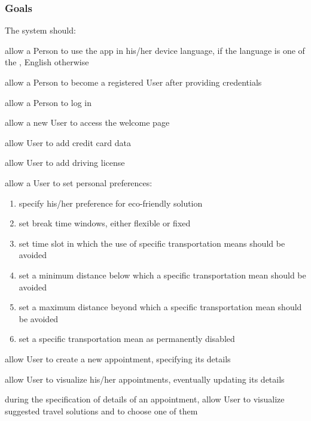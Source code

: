 \subsubsection{Goals}
The system should:
	\begin{enumerate}[label={[G\arabic*]}]
		\item \label{G_dev_language} allow a Person to use the app in his/her device language, if the language is one of the , English otherwise
		\item \label{G_become_registered} allow a Person to become a registered User after providing credentials
		\item \label{G_log_in} allow a Person to log in
		\item \label{G_welcome_page} allow a new User to access the welcome page
		\item \label{G_add_credit_card} allow User to add credit card data
		\item \label{G_add_licence} allow User to add driving license
		\item \label{G_pers_preferences} allow a User to set personal preferences:
		\begin{enumerate}[label=\theenumi\#{\arabic*}]
			\item \label{G_eco_friendly} specify his/her preference for eco-friendly solution
			\item \label{G_break_windows} set break time windows, either flexible or fixed
			\item \label{G_time_slot} set time slot in which the use of specific transportation means should be avoided
			\item \label{G_min_distance} set a minimum distance below which a specific transportation mean should be avoided
			\item \label{G_max_distance} set a maximum distance beyond which a specific transportation mean should be avoided
			\item \label{G_transp_disabled} set a specific transportation mean as permanently disabled
		\end{enumerate}
		\item \label{G_new_appointment} allow User to create a new appointment, specifying its details
		\item \label{G_visualize&update} allow User to visualize his/her appointments, eventually updating its details
		\item \label{G_choose_sug} during the specification of details of an appointment, allow User to visualize suggested travel solutions and to choose one of them

\end{enumerate}
